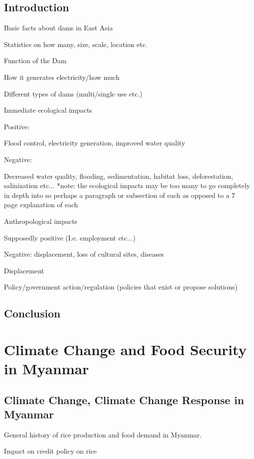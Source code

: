 \documentclass{book}\usepackage{knitr}
\begin{document}
\begin{knitrout}
\begin{kframe}
\section{Introduction}

Basic facts about dams in East Asia


Statistics on how many, size, scale, location etc.

Function of the Dam 

How it generates electricity/how much

Different types of dams (multi/single use etc.) 

Immediate ecological impacts 

Positive: 

Flood control, electricity generation, improved water quality 

Negative: 

Decreased water quality, flooding, sedimentation, habitat loss, deforestation, salinization etc... *note: the ecological impacts may be too many to go completely in depth into so perhaps a paragraph or subsection of each as opposed to a 7 page explanation of each 

Anthropological impacts 

Supposedly positive (I.e. employment etc...)

Negative: displacement, loss of cultural sites, diseases 

Displacement

Policy/government action/regulation  (policies that exist or propose solutions)

\section{Conclusion}



\chapter{Climate Change and Food Security in Myanmar}



\section{Climate Change, Climate Change Response in Myanmar}


General history of rice production and food demand in Myanmar. 

Impact on credit policy on rice 


\end{kframe}
\end{knitrout}
\end{document}
